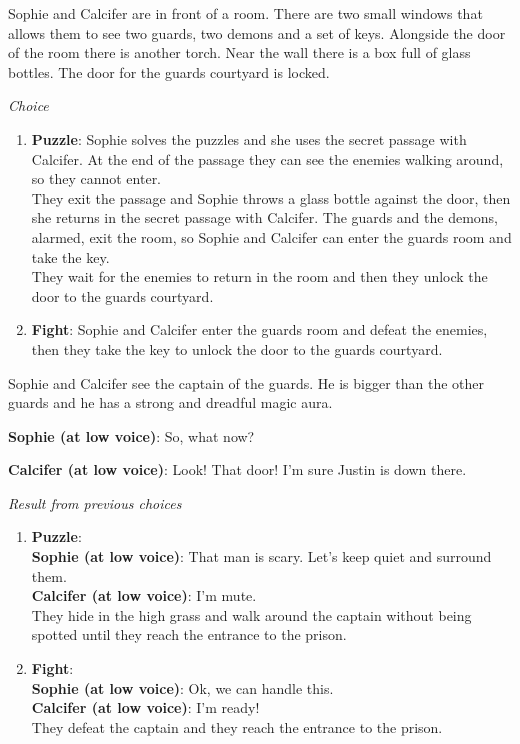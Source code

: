 Sophie and Calcifer are in front of a room. There are two small windows that allows them to see two guards, two demons and a set of keys. Alongside the door of the room there is another torch. Near the wall there is a box full of glass bottles. The door for the guards courtyard is locked.

\textit{Choice}
\begin{enumerate}
  \item \textbf{Puzzle}: Sophie solves the puzzles and she uses the secret passage with Calcifer. At the end of the passage they can see the enemies walking around, so they cannot enter.\\
  They exit the passage and Sophie throws a glass bottle against the door, then she returns in the secret passage with Calcifer. The guards and the demons, alarmed, exit the room, so Sophie and Calcifer can enter the guards room and take the key.\\
  They wait for the enemies to return in the room and then they unlock the door to the guards courtyard.

  \item \textbf{Fight}: Sophie and Calcifer enter the guards room and defeat the enemies, then they take the key to unlock the door to the guards courtyard.
\end{enumerate}


Sophie and Calcifer see the captain of the guards. He is bigger than the other guards and he has a strong and dreadful magic aura.

\textbf{Sophie (at low voice)}: So, what now?

\textbf{Calcifer (at low voice)}: Look! That door! I'm sure Justin is down there.

\textit{Result from previous choices}
\begin{enumerate}
  \item \textbf{Puzzle}:\\
  \textbf{Sophie (at low voice)}: That man is scary. Let's keep quiet and surround them.\\
  \textbf{Calcifer (at low voice)}: I'm mute.\\
  They hide in the high grass and walk around the captain without being spotted until they reach the entrance to the prison.

  \item \textbf{Fight}:\\
  \textbf{Sophie (at low voice)}: Ok, we can handle this.\\
  \textbf{Calcifer (at low voice)}: I'm ready!\\
  They defeat the captain and they reach the entrance to the prison.
\end{enumerate}

